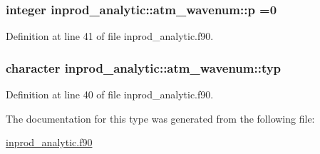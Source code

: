 \hypertarget{structinprod__analytic_1_1atm__wavenum_a5a938641d8939931bc4eb71499298a6a}{
\subsubsection[{p}]{\setlength{\rightskip}{0pt plus 5cm}integer inprod\-\_\-analytic\-::atm\-\_\-wavenum\-::p =0\hspace{0.3cm}{\ttfamily [private]}}}\label{structinprod__analytic_1_1atm__wavenum_a5a938641d8939931bc4eb71499298a6a}


Definition at line 41 of file inprod\-\_\-analytic.\-f90.

\hypertarget{structinprod__analytic_1_1atm__wavenum_a1c12be211e96c5a773aae4c2146a3792}{
\subsubsection[{typ}]{\setlength{\rightskip}{0pt plus 5cm}character inprod\-\_\-analytic\-::atm\-\_\-wavenum\-::typ\hspace{0.3cm}{\ttfamily [private]}}}\label{structinprod__analytic_1_1atm__wavenum_a1c12be211e96c5a773aae4c2146a3792}


Definition at line 40 of file inprod\-\_\-analytic.\-f90.



The documentation for this type was generated from the following file\-:\begin{DoxyCompactItemize}
\item 
\hyperlink{inprod__analytic_8f90}{inprod\-\_\-analytic.\-f90}\end{DoxyCompactItemize}
